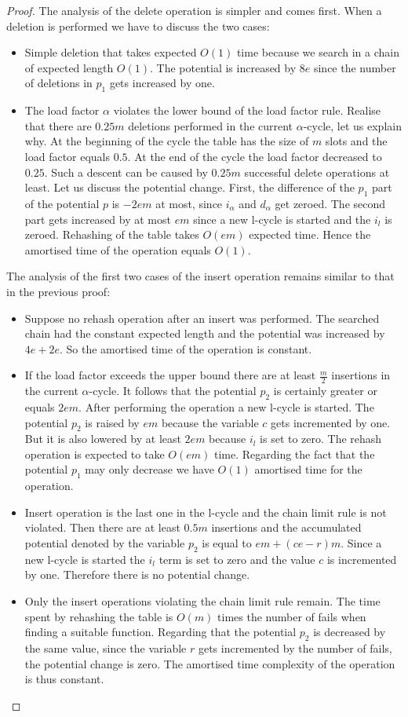 \begin{proof}
The analysis of the delete operation is simpler and comes first. When a deletion is performed we have to discuss the two cases:
\begin{itemize}
\item Simple deletion that takes expected $O(1)$ time because we search in a chain of expected length $O(1)$. The potential is increased by $8e$ since the number of deletions in $p_1$ gets increased by one.
\item The load factor $\alpha$ violates the lower bound of the load factor rule. Realise that there are $0.25 m$ deletions performed in the current $\alpha$-cycle, let us explain why. At the beginning of the cycle the table has the size of $m$ slots and the load factor equals $0.5$. At the end of the cycle the load factor decreased to $0.25$. Such a descent can be caused by $0.25 m$ successful delete operations at least. Let us discuss the potential change. First, the difference of the $p_1$ part of the potential $p$ is $-2em$ at most, since $i_{\alpha}$ and $d_{\alpha}$ get zeroed. The second part gets increased by at most $em$ since a new l-cycle is started and the $i_l$ is zeroed. Rehashing of the table takes $O(em)$ expected time. Hence the amortised time of the operation equals $O(1)$. 
\end{itemize}

The analysis of the first two cases of the insert operation remains similar to that in the previous proof:
\begin{itemize}
\item Suppose no rehash operation after an insert was performed. The searched chain had the constant expected length and the potential was increased by $4e + 2e$. So the amortised time of the operation is constant.
\item If the load factor exceeds the upper bound there are at least $\frac{m}{2}$ insertions in the current $\alpha$-cycle. It follows that the potential $p_2$ is certainly greater or equals $2em$. After performing the operation a new l-cycle is started. The potential $p_2$ is raised by $em$ because the variable $c$ gets incremented by one. But it is also lowered by at least $2em$ because $i_l$ is set to zero. The rehash operation is expected to take $O(em)$ time. Regarding the fact that the potential $p_1$ may only decrease we have $O(1)$ amortised time for the operation.
\item Insert operation is the last one in the l-cycle and the chain limit rule is not violated. Then there are at least $0.5 m$ insertions and the accumulated potential denoted by the variable $p_2$ is equal to $em + (ce - r)m$. Since a new l-cycle is started the $i_l$ term is set to zero and the value $c$ is incremented by one. Therefore there is no potential change.
\item Only the insert operations violating the chain limit rule remain. The time spent by rehashing the table is $O(m)$ times the number of fails when finding a suitable function. Regarding that the potential $p_2$ is decreased by the same value, since the variable $r$ gets incremented by the number of fails, the potential change is zero. The amortised time complexity of the operation is thus constant.


\end{itemize}
\end{proof}
